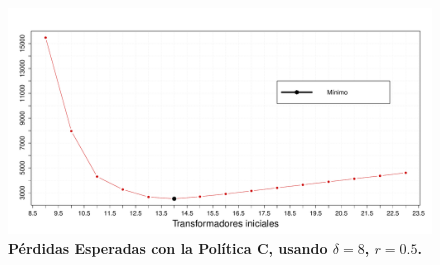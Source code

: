 %
%
%	
%
%

\begin{figure}[h!]
\begin{center}
\includegraphics[scale=0.3]{puntocinco.pdf}
\end{center}
\vspace{-1 cm}\caption{\bf P\'erdidas Esperadas con la Pol\'itica C, usando $\delta=8$, $r=0.5$.}\label{u385i}
\end{figure}

